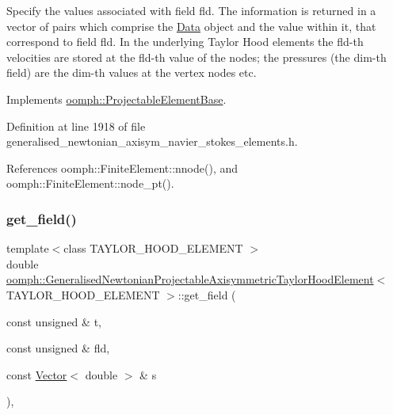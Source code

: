 Specify the values associated with field fld. The information is returned in a vector of pairs which comprise the \hyperlink{classoomph_1_1Data}{Data} object and the value within it, that correspond to field fld. In the underlying Taylor Hood elements the fld-\/th velocities are stored at the fld-\/th value of the nodes; the pressures (the dim-\/th field) are the dim-\/th values at the vertex nodes etc. 



Implements \hyperlink{classoomph_1_1ProjectableElementBase_a644306ebdf16f334344c2d27d72f18b7}{oomph\+::\+Projectable\+Element\+Base}.



Definition at line 1918 of file generalised\+\_\+newtonian\+\_\+axisym\+\_\+navier\+\_\+stokes\+\_\+elements.\+h.



References oomph\+::\+Finite\+Element\+::nnode(), and oomph\+::\+Finite\+Element\+::node\+\_\+pt().

\mbox{\label{classoomph_1_1GeneralisedNewtonianProjectableAxisymmetricTaylorHoodElement_aa95fa09d025d470d83606c41174c9498}} 
\subsubsection{\texorpdfstring{get\+\_\+field()}{get\_field()}}
{\footnotesize\ttfamily template$<$class T\+A\+Y\+L\+O\+R\+\_\+\+H\+O\+O\+D\+\_\+\+E\+L\+E\+M\+E\+NT $>$ \\
double \hyperlink{classoomph_1_1GeneralisedNewtonianProjectableAxisymmetricTaylorHoodElement}{oomph\+::\+Generalised\+Newtonian\+Projectable\+Axisymmetric\+Taylor\+Hood\+Element}$<$ T\+A\+Y\+L\+O\+R\+\_\+\+H\+O\+O\+D\+\_\+\+E\+L\+E\+M\+E\+NT $>$\+::get\+\_\+field (\begin{DoxyParamCaption}\item[{const unsigned \&}]{t,  }\item[{const unsigned \&}]{fld,  }\item[{const \hyperlink{classoomph_1_1Vector}{Vector}$<$ double $>$ \&}]{s }\end{DoxyParamCaption})\hspace{0.3cm}{\ttfamily [inline]}, {\ttfamily [virtual]}}



